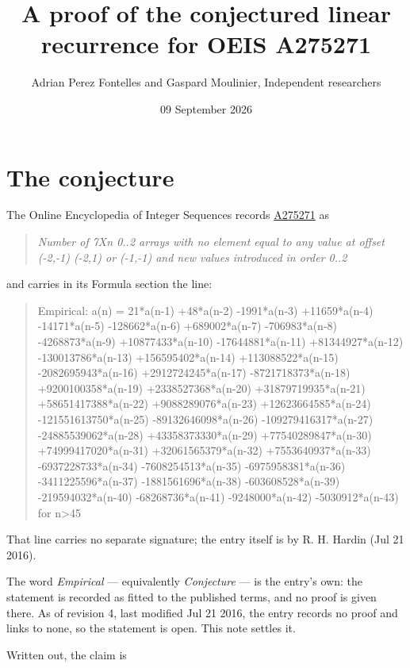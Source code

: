\documentclass[11pt]{article}
\title{A proof of the conjectured linear recurrence for OEIS A275271}
\author{Adrian Perez Fontelles and Gaspard Moulinier, Independent researchers}
\date{09 September 2026}
\theoremstyle{definition}
\begin{document}
\maketitle
\section{The conjecture}

The Online Encyclopedia of Integer Sequences records \href{https://oeis.org/A275271}{A275271} as

\begin{quote}\itshape Number of 7Xn 0..2 arrays with no element equal to any value at offset (-2,-1) (-2,1) or (-1,-1) and new values introduced in order 0..2\end{quote}

and carries in its Formula section the line:

\begin{quote}\ttfamily Empirical: a(n) = 21*a(n-1) +48*a(n-2) -1991*a(n-3) +11659*a(n-4) -14171*a(n-5) -128662*a(n-6) +689002*a(n-7) -706983*a(n-8) -4268873*a(n-9) +10877433*a(n-10) -17644881*a(n-11) +81344927*a(n-12) -130013786*a(n-13) +156595402*a(n-14) +113088522*a(n-15) -2082695943*a(n-16) +2912724245*a(n-17) -8721718373*a(n-18) +9200100358*a(n-19) +2338527368*a(n-20) +31879719935*a(n-21) +58651417388*a(n-22) +9088289076*a(n-23) +12623664585*a(n-24) -121551613750*a(n-25) -89132646098*a(n-26) -109279416317*a(n-27) -24885539062*a(n-28) +43358373330*a(n-29) +77540289847*a(n-30) +74999417020*a(n-31) +32061565379*a(n-32) +7553640937*a(n-33) -6937228733*a(n-34) -7608254513*a(n-35) -6975958381*a(n-36) -3411225596*a(n-37) -1881561696*a(n-38) -603608528*a(n-39) -219594032*a(n-40) -68268736*a(n-41) -9248000*a(n-42) -5030912*a(n-43) for n>45\end{quote}

That line carries no separate signature; the entry itself is by R. H. Hardin (Jul 21 2016).

The word {\itshape Empirical} --- equivalently {\itshape Conjecture} --- is the entry's own: the statement is recorded as fitted to the published terms, and no proof is given there. As of revision 4, last modified Jul 21 2016, the entry records no proof and links to none, so the statement is open. This note settles it.

Written out, the claim is
\end{document}
